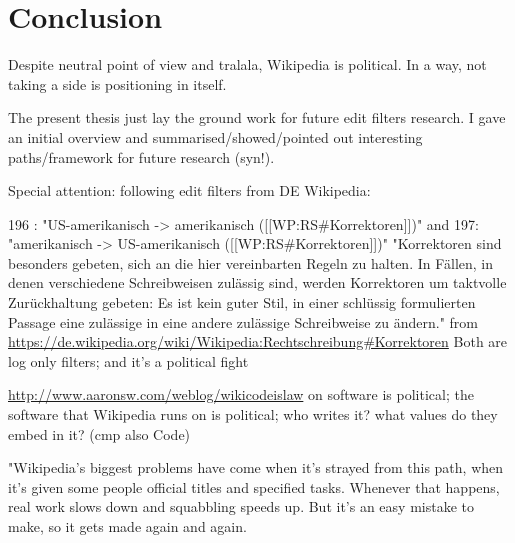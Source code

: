 %
\chapter{Conclusion}
\label{chap:conclusion}

Despite neutral point of view and tralala, Wikipedia is political.
In a way, not taking a side is positioning in itself.

The present thesis just lay the ground work for future edit filters research.
I gave an initial overview and summarised/showed/pointed out interesting paths/framework for future research (syn!).


Special attention: following edit filters from DE Wikipedia:

196 : "US-amerikanisch -> amerikanisch ([[WP:RS\#Korrektoren]])"
and 197: "amerikanisch -> US-amerikanisch ([[WP:RS\#Korrektoren]])"
"Korrektoren sind besonders gebeten, sich an die hier vereinbarten Regeln zu halten. In Fällen, in denen verschiedene Schreibweisen zulässig sind, werden Korrektoren um taktvolle Zurückhaltung gebeten: Es ist kein guter Stil, in einer schlüssig formulierten Passage eine zulässige in eine andere zulässige Schreibweise zu ändern." from \url{https://de.wikipedia.org/wiki/Wikipedia:Rechtschreibung#Korrektoren}
Both are log only filters;
and it's a political fight


\url{http://www.aaronsw.com/weblog/wikicodeislaw}
on software is political; the software that Wikipedia runs on is political; who writes it? what values do they embed in it? (cmp also Code)

"Wikipedia’s biggest problems have come when it’s strayed from this path, when it’s given some people official titles and specified tasks. Whenever that happens, real work slows down and squabbling speeds up. But it’s an easy mistake to make, so it gets made again and again.

